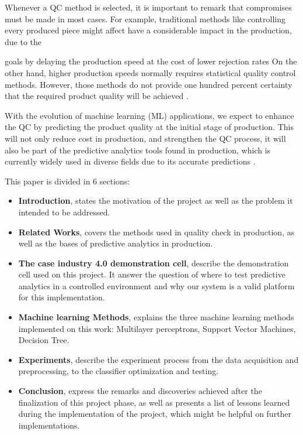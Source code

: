 \documentclass[5p,times,procedia]{elsarticle}
\begin{document}
Whenever a QC method is selected, it is important to remark that compromises must be made in most cases. For example, traditional methods like controlling every produced piece might affect have a considerable impact in the production, due to the 

goals by delaying the production speed at the cost of lower rejection rates On the other hand, higher production speeds normally requires statistical quality control methods. However, those methods do not provide one hundred percent certainty that the required product quality will be achieved \cite{selvamuthu2018introduction, kurniati2015quality}.

With the evolution of machine learning (ML) applications, we expect to enhance the QC by predicting the product quality at the initial stage of production. This will not only reduce cost in production, and strengthen the QC process, it will also be part of the predictive analytics tools found in production, which is currently widely used in diverse fields due to its accurate predictions \cite{bishop2006pattern, krauss2019machine}.

This paper is divided in 6 sections:

\begin{itemize}
       \item \textbf{Introduction}, states the motivation of the project as well as the problem it intended to be addressed.
       \item \textbf{Related Works}, covers the methods used in quality check in production, as well as the bases of predictive analytics in production.
       \item \textbf{The case industry 4.0 demonstration cell}, describe the demonstration cell used on this project. It answer the question of where to test predictive analytics in a controlled environment and why our system is a valid platform for this implementation.
       \item \textbf{Machine learning Methods}, explains the three machine learning methods implemented on this work: Multilayer perceptrons, Support Vector Machines, Decision Tree.
       \item \textbf{Experiments}, describe the experiment process from the data acquisition and preprocessing, to the classifier optimization and testing.
       \item \textbf{Conclusion}, express the remarks and discoveries achieved after the finalization of this project phase, as well as presents a list of lessons learned during the implementation of the project, which might be helpful on further implementations.
\end{itemize}
\end{document}
